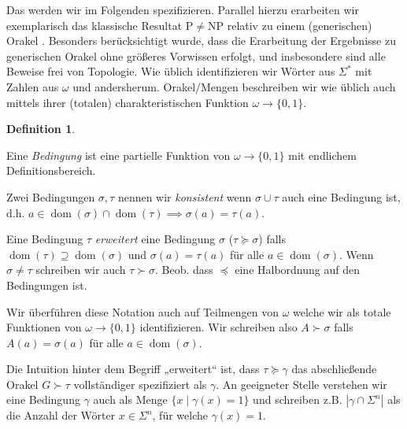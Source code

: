 \documentclass[nofonts]{uebung}
\theoremstyle{definition}
\newtheorem{definition}[theorem]{Definition}
\def\P{\ensuremath{\mathrm{P}}}
\def\NP{\ensuremath{\mathrm{NP}}}
\DeclareMathOperator{\dom}{dom}
\begin{document}
Das werden wir im Folgenden spezifizieren. Parallel hierzu erarbeiten wir exemplarisch das klassische Resultat $\P\neq\NP$ relativ zu einem (generischen) Orakel \parencite{baker_relativizations_1975}.
Besonders berücksichtigt wurde, dass die Erarbeitung der Ergebnisse zu generischen Orakel ohne größeres Vorwissen erfolgt, und insbesondere sind alle Beweise frei von Topologie.
Wie üblich identifizieren wir Wörter aus $\Sigma^*$ mit Zahlen aus $\omega$ und andersherum.
Orakel/Mengen beschreiben wir wie üblich auch mittels ihrer (totalen) charakteristischen Funktion $\omega\to\{0,1\}$.

\begin{definition}\begin{thmenum}
    \item Eine \emph{Bedingung} ist eine partielle Funktion von $\omega \to \{0,1\}$ mit endlichem Definitionsbereich.
        \item Zwei Bedingungen $\sigma,\tau$ nennen wir \emph{konsistent} wenn $\sigma\cup\tau$ auch eine Bedingung ist, d.h. $a\in\dom(\sigma)\cap\dom(\tau)\implies \sigma(a)=\tau(a)$.
    \item Eine Bedingung $\tau$ \emph{erweitert} eine Bedingung $\sigma$ ($\tau\succeq \sigma$) falls $\dom(\tau)\supseteq\dom(\sigma)$ und $\sigma(a)=\tau(a)$ für alle $a\in\dom(\sigma)$.
    Wenn $\sigma\neq\tau$ schreiben wir auch $\tau\succ\sigma$. Beob. dass $\preceq$ eine Halbordnung auf den Bedingungen ist.
    \item Wir überführen diese Notation auch auf Teilmengen von $\omega$ welche wir als totale Funktionen von $\omega\to\{0,1\}$ identifizieren.
    Wir schreiben also $A\succ \sigma$ falls $A(a)=\sigma(a)$ für alle $a\in\dom(\sigma)$.
\end{thmenum}
\end{definition}
Die Intuition hinter dem Begriff „erweitert“ ist, dass $\tau\succeq \gamma$ das abschließende Orakel $G\succ\tau$ vollständiger spezifiziert als $\gamma$.
An geeigneter Stelle verstehen wir eine Bedingung $\gamma$ auch als Menge $\{ x \mid \gamma(x)=1\}$ und schreiben z.B. $|\gamma\cap\Sigma^n|$ als die Anzahl der Wörter $x\in \Sigma^n$, für welche $\gamma(x)=1$.
\end{document}
